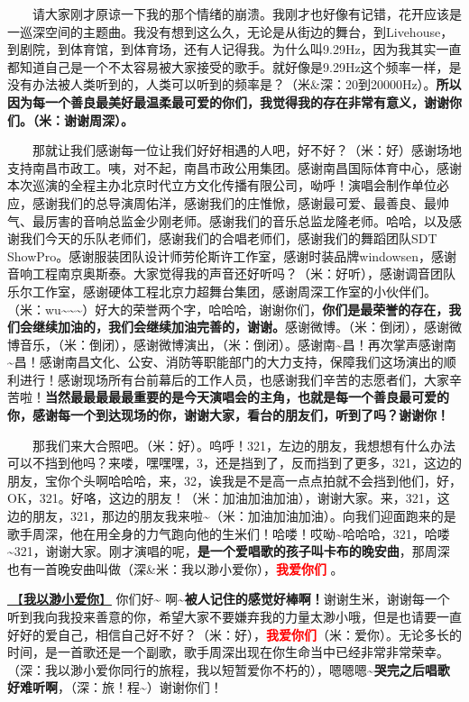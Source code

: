 \documentclass[]{ctexbook}
\begin{document}
  请大家刚才原谅一下我的那个情绪的崩溃。我刚才也好像有记错，花开应该是一巡深空间的主题曲。我没有想到这么久，无论是从街边的舞台，到Livehouse，到剧院，到体育馆，到体育场，还有人记得我。为什么叫9.29Hz，因为我其实一直都知道自己是一个不太容易被大家接受的歌手。就好像是9.29Hz这个频率一样，是没有办法被人类听到的，人类可以听到的频率是？（米\&深：20到20000Hz）。\textbf{所以因为每一个善良最美好最温柔最可爱的你们，我觉得我的存在非常有意义，谢谢你们。（米：谢谢周深）。}

  那就让我们感谢每一位让我们好好相遇的人吧，好不好？（米：好）感谢场地支持南昌市政工。咦，对不起，南昌市政公用集团。感谢南昌国际体育中心，感谢本次巡演的全程主办北京时代立方文化传播有限公司，呦呼！演唱会制作单位必应，感谢我们的总导演周佑洋，感谢我们的庄惟惞，感谢最可爱、最善良、最帅气、最厉害的音响总监金少刚老师。感谢我们的音乐总监龙隆老师。哈哈，以及感谢我们今天的乐队老师们，感谢我们的合唱老师们，感谢我们的舞蹈团队SDT ShowPro。感谢服装团队设计师劳伦斯许工作室，感谢时装品牌windowsen，感谢音响工程南京奥斯泰。大家觉得我的声音还好听吗？（米：好听），感谢调音团队乐尔工作室，感谢硬体工程北京力超舞台集团，感谢周深工作室的小伙伴们。（米：wu\textasciitilde\textasciitilde\textasciitilde）好大的荣誉两个字，哈哈哈，谢谢你们，\textbf{你们是最荣誉的存在，我们会继续加油的，我们会继续加油完善的，谢谢。}感谢微博。（米：倒闭），感谢微博音乐，（米：倒闭），感谢微博演出，（米：倒闭）。感谢南\textasciitilde 昌！再次掌声感谢南\textasciitilde 昌！感谢南昌文化、公安、消防等职能部门的大力支持，保障我们这场演出的顺利进行！感谢现场所有台前幕后的工作人员，也感谢我们辛苦的志愿者们，大家辛苦啦！\textbf{当然最最最最最重要的是今天演唱会的主角，也就是每一个善良最可爱的你，感谢每一个到达现场的你，谢谢大家，看台的朋友们，听到了吗？谢谢你！}

  那我们来大合照吧。（米：好）。呜呼！321，左边的朋友，我想想有什么办法可以不挡到他吗？来喽，嘿嘿嘿，3，还是挡到了，反而挡到了更多，321，这边的朋友，宝你个头啊哈哈哈，来，32，诶我是不是高一点点拍就不会挡到他们，好，OK，321。好咯，这边的朋友！（米：加油加油加油），谢谢大家。来，321，这边的朋友，321，那边的朋友我来啦\textasciitilde（米：加油加油加油）。向我们迎面跑来的是歌手周深，他在用全身的力气跑向他的生米们！哈喽！哎呦\textasciitilde 哈哈哈，321，哈喽\textasciitilde321，谢谢大家。刚才演唱的呢，\textbf{是一个爱唱歌的孩子叫卡布的晚安曲}，那周深也有一首晚安曲叫做（深\&米：我以渺小爱你），\textbf{\textcolor{red}{我爱你们} }。

\hyperref[loving-you-in-my-humble-way]{🎵【\textbf{我以渺小爱你}】} 你们好\textasciitilde{}
啊\textasciitilde{}\textbf{被人记住的感觉好棒啊！}谢谢生米，谢谢每一个听到我向我投来善意的你，希望大家不要嫌弃我的力量太渺小哦，但是也请要一直好好的爱自己，相信自己好不好？（米：好），\textbf{\textcolor{red}{我爱你们}}（米：爱你）。无论多长的时间，是一首歌还是一个副歌，歌手周深出现在你生命当中已经非常非常荣幸。（深：我以渺小爱你同行的旅程，我以短暂爱你不朽的），嗯嗯嗯\textasciitilde{}\textbf{哭完之后唱歌好难听啊}，（深：旅！程\textasciitilde）谢谢你们！
\end{document}
